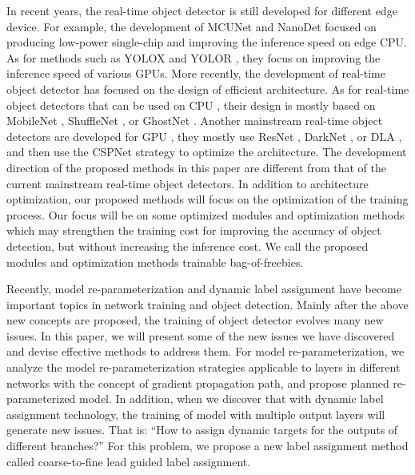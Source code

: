 \documentclass[10pt,twocolumn,letterpaper]{article}
\begin{document}
		In recent years, the real-time object detector is still developed for different edge device. For example, the development of MCUNet \cite{lin2020mcunet, lin2021memory} and NanoDet \cite{lyu2021nano} focused on producing low-power single-chip and improving the inference speed on edge CPU. As for methods such as YOLOX \cite{ge2021yolox} and YOLOR \cite{wang2021you}, they focus on improving the inference speed of various GPUs. More recently, the development of real-time object detector has focused on the design of efficient architecture. As for real-time object detectors that can be used on CPU \cite{lyu2021nano, yu2021pp, xiong2021mobiledets, wu2021fbnetv5}, their design is mostly based on MobileNet \cite{howard2017mobilenets, sandler2018mobilenetv2, howard2019searching}, ShuffleNet \cite{zhang2018shufflenet, ma2018shufflenetv2}, or GhostNet \cite{han2020ghostnet}. Another mainstream real-time object detectors are developed for GPU \cite{wang2021you, ge2021yolox, zhou2019objects}, they mostly use ResNet \cite{he2016deep}, DarkNet \cite{redmon2018yolov3}, or DLA \cite{yu2018deep}, and then use the CSPNet \cite{wang2020cspnet} strategy to optimize the architecture. The development direction of the proposed methods in this paper are different from that of the current mainstream real-time object detectors. In addition to architecture optimization, our proposed methods will focus on the optimization of the training process. Our focus will be on some optimized modules and optimization methods which may strengthen the training cost for improving the accuracy of object detection, but without increasing the inference cost. We call the proposed modules and optimization methods trainable bag-of-freebies.
	
		\newpage
		
		Recently, model re-parameterization \cite{ding2021repvgg, ding2021diverse, hu2022online} and dynamic label assignment \cite{ge2021ota, feng2021tood, li2022dual} have become important topics in network training and object detection. Mainly after the above new concepts are proposed, the training of object detector evolves many new issues. In this paper, we will present some of the new issues we have discovered and devise effective methods to address them. For model re-parameterization, we analyze the model re-parameterization strategies applicable to layers in different networks with the concept of gradient propagation path, and propose planned re-parameterized model. In addition, when we discover that with dynamic label assignment technology, the training of model with multiple output layers will generate new issues. That is: ``How to assign dynamic targets for the outputs of different branches?'' For this problem, we propose a new label assignment method called coarse-to-fine lead guided label assignment.
		
\end{document}
